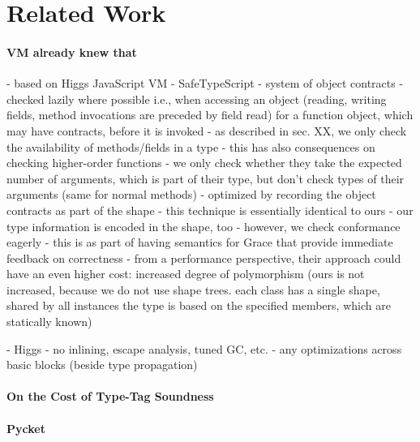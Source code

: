 
\section{Related Work}

\paragraph{VM already knew that}

\begin{cnote}
- based on Higgs JavaScript VM
- SafeTypeScript
  - system of object contracts
  - checked lazily where possible
    i.e., when accessing an object (reading, writing fields, method invocations are preceded by field read)
    for a function object, which may have contracts, before it is invoked
  - as described in sec. XX, we only check the availability of methods/fields
    in a type
    - this has also consequences on checking higher-order functions
      - we only check whether they take the expected number of arguments,
        which is part of their type, but don't check types of their arguments
        (same for normal methods)
  - optimized by recording the object contracts as part of the shape
  - this technique is essentially identical to ours
    - our type information is encoded in the shape, too
    - however, we check conformance eagerly
      - this is as part of having semantics for Grace that provide immediate
        feedback on correctness
    - from a performance perspective, their approach could have an even higher
      cost: increased degree of polymorphism (ours is not increased,
      because we do not use shape trees.
      each class has a single shape, shared by all instances
      the type is based on the specified members, which are statically known)

- Higgs
  - no inlining, escape analysis, tuned GC, etc.
  - any optimizations across basic blocks (beside type propagation)

\end{cnote}


\paragraph{On the Cost of Type-Tag Soundness}
\paragraph{Pycket}
